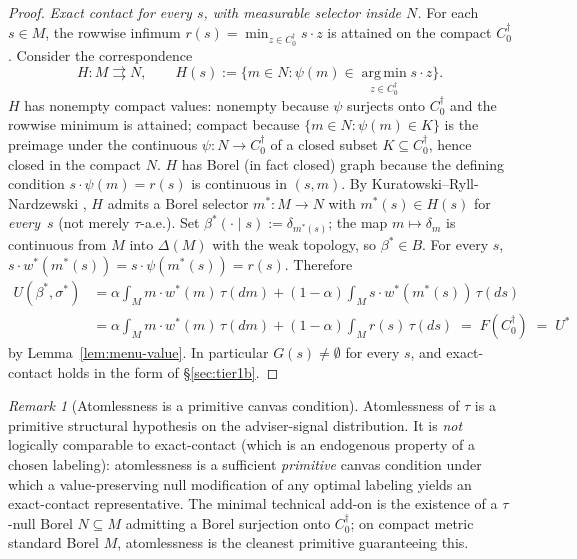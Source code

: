 \documentclass[11pt]{article}
\theoremstyle{definition}
\theoremstyle{remark}
\newtheorem{remark}[theorem]{Remark}
\newcommand{\argmin}{\operatorname*{arg\,min}}
\begin{document}
\begin{proof}
\emph{Exact contact for every $s$, with measurable selector inside $N$.}
For each $s \in M$, the rowwise infimum
$r(s) = \min_{z \in C^\dagger_0} s \cdot z$ is attained on the compact
$C^\dagger_0$. Consider the correspondence
\[
  H : M \rightrightarrows N, \qquad
  H(s) := \{m \in N : \psi(m) \in \argmin_{z \in C^\dagger_0} s \cdot z\}.
\]
$H$ has nonempty compact values: nonempty because $\psi$ surjects onto
$C^\dagger_0$ and the rowwise minimum is attained; compact because
$\{m \in N : \psi(m) \in K\}$ is the preimage under the continuous
$\psi : N \to C^\dagger_0$ of a closed subset $K \subseteq C^\dagger_0$,
hence closed in the compact $N$. $H$ has Borel (in fact closed) graph
because the defining condition $s \cdot \psi(m) = r(s)$ is continuous
in $(s,m)$. By Kuratowski--Ryll-Nardzewski
\cite[Thm.~18.13]{AliprantisBorder2006}, $H$ admits a Borel selector
$m^* : M \to N$ with $m^*(s) \in H(s)$ for \emph{every}~$s$
(not merely $\tau$-a.e.). Set
$\beta^*(\cdot \mid s) := \delta_{m^*(s)}$; the map
$m \mapsto \delta_m$ is continuous from $M$ into $\Delta(M)$ with the
weak topology, so $\beta^* \in B$. For every $s$,
$s \cdot w^*(m^*(s)) = s \cdot \psi(m^*(s)) = r(s)$. Therefore
\begin{align*}
  U(\beta^*, \sigma^*)
    &= \alpha\!\int_M m \cdot w^*(m)\,\tau(dm)
       + (1-\alpha)\!\int_M s \cdot w^*(m^*(s))\,\tau(ds)\\
    &= \alpha\!\int_M m \cdot w^*(m)\,\tau(dm)
       + (1-\alpha)\!\int_M r(s)\,\tau(ds) \;=\; F(C^\dagger_0) \;=\; U^*
\end{align*}
by Lemma~\ref{lem:menu-value}. In particular $G(s) \ne \emptyset$ for
every $s$, and exact-contact holds in the form of \S\ref{sec:tier1b}.
\end{proof}

\begin{remark}[Atomlessness is a primitive canvas condition]
Atomlessness of $\tau$ is a primitive structural hypothesis on the
adviser-signal distribution. It is \emph{not} logically comparable to
exact-contact (which is an endogenous property of a chosen labeling):
atomlessness is a sufficient \emph{primitive} canvas condition under
which a value-preserving null modification of any optimal labeling
yields an exact-contact representative. The minimal technical add-on
is the existence of a $\tau$-null Borel $N \subseteq M$ admitting a
Borel surjection onto $C^\dagger_0$; on compact metric standard Borel
$M$, atomlessness is the cleanest primitive guaranteeing this.
\end{remark}
\end{document}
